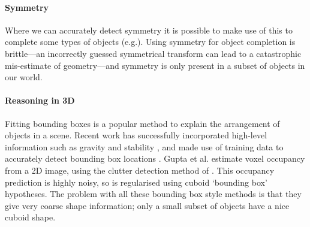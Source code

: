 \documentclass[10pt,twocolumn,letterpaper]{article}
\makeatletter
\renewcommand*{\eg}{e.g.\@\xspace}
\newcommand*{\ea}{et al.\@\xspace}
\makeatother
\begin{document}
\paragraph{Symmetry}
Where we can accurately detect symmetry it is possible to make use of this to complete some types of objects (\eg \cite{law-cviu-2010, thrun-iccv-2005, kroemer-humanoids-2012}). 
Using symmetry for object completion is brittle---an incorrectly guessed symmetrical transform can lead to a catastrophic mis-estimate of geometry---and symmetry is only present in a subset of objects in our world.

\paragraph{Reasoning in 3D}
Fitting bounding boxes is a popular method to explain the arrangement of objects in a scene.
Recent work has successfully incorporated high-level information such as gravity and stability
 \cite{shao-siggraphasia-2014, jia-cvpr-2013}, and made use of training data to accurately detect bounding box locations \cite{hedau-cvpr-2012}.
 Gupta \ea \cite{gupta-cvpr-2011} estimate voxel occupancy from a 2D image, using the clutter detection method of \cite{hedau-iccv-2009}. This occupancy prediction is highly noisy, so is regularised using cuboid `bounding box' hypotheses.
The problem with all these bounding box style methods is that they give very coarse shape information; only a small subset of objects have a nice cuboid shape.
\end{document}
